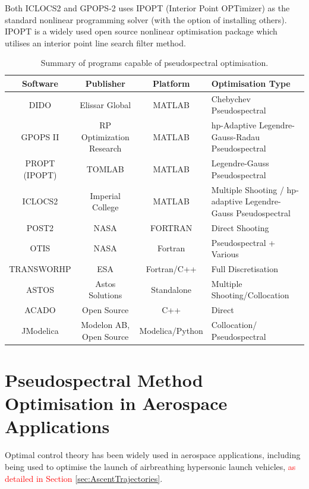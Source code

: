 Both ICLOCS2 and GPOPS-2 uses IPOPT\cite{Wachter2006} (Interior Point OPTimizer) as the standard nonlinear programming solver (with the option of installing others). IPOPT is a widely used open source nonlinear optimisation package which utilises an interior point line search filter method. 

\begin{table}[ht]
	
	\begin{tabular}{|c|c|c| p{4cm}|}
		\hline \textbf{Software} & \textbf{Publisher} & \textbf{Platform} & \textbf{Optimisation Type} \\ 
		\hline DIDO\cite{Ross2002} & Elissar Global & MATLAB & Chebychev Pseudospectral \\ 
		\hline GPOPS II\cite{Rao2010} & RP Optimization Research & MATLAB & \textsf{hp}-Adaptive Legendre-Gauss-Radau Pseudospectral \\ 
		\hline PROPT (IPOPT)\cite{Rutquist2010}& TOMLAB & MATLAB & Legendre-Gauss  Pseudospectral  \\ 
		\hline ICLOCS2\cite{iclocs} & Imperial College & MATLAB &  Multiple Shooting / \textsf{hp}-adaptive Legendre-Gauss Pseudospectral  \\ 
		\hline POST2\cite{WilliamColson} & NASA & FORTRAN & Direct Shooting \\ 
		\hline OTIS\cite{otis} & NASA  & Fortran & Pseudospectral + Various  \\ 
		\hline TRANSWORHP\cite{Wassel2013} & ESA & Fortran/C++ & Full Discretisation \\ 
		\hline ASTOS\cite{astos} & Astos Solutions & Standalone & Multiple Shooting/Collocation  \\  
		\hline ACADO\cite{Houska2011} & Open Source & C++ &  Direct \\  
		\hline JModelica\cite{jmodelica} & Modelon AB, Open Source & Modelica/Python &  Collocation/ Pseudospectral \\  
		
		\hline 
	\end{tabular} 
	
	\caption{Summary of programs capable of pseudospectral optimisation.}
	\label{table:programs}
\end{table}




\section{Pseudospectral Method Optimisation in Aerospace Applications}
Optimal control theory has been widely used in aerospace applications, including being used to optimise the launch of airbreathing hypersonic launch vehicles\cite{Powell1991,Lu1993,Trefny1999,Roche2000,Pescetelli2012,Young2006}, \textcolor{red}{as detailed in Section \ref{sec:AscentTrajectories}}.










